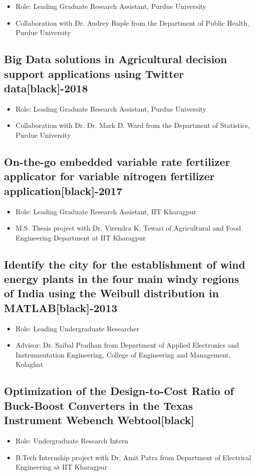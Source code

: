 \documentclass[10pt]{article}
\newcommand{\subsectiondate}[2]{%
  \subsection*{%
    #1\enspace\xdotfill[.5ex]{1pt}[black]\enspace #2%
  }%
}
\begin{document}
\begin{itemize}[label=-, labelindent=1.5em, leftmargin=2.5em, labelsep=0.6 em, itemsep =0pt, topsep=0pt]
    \item[-] Role: Leading Graduate Research Assistant, Purdue University
    \item[-] Collaboration with Dr. Audrey Ruple from the Department of Public Health, Purdue University
    
\end{itemize}
\subsectiondate{Big Data solutions in Agricultural decision support applications using Twitter data}{2017-2018}
\begin{itemize}[label=-, labelindent=1.5em, leftmargin=2.5em, labelsep=0.6 em, itemsep =0pt, topsep=0pt]
    \item[-] Role: Leading Graduate Research Assistant, Purdue University
    \item[-] Collaboration with Dr. Dr. Mark D. Ward from the Department of Statistics, Purdue University
    
\end{itemize}
\subsectiondate{On-the-go embedded variable rate fertilizer applicator for variable nitrogen fertilizer application}{2014-2017}
\begin{itemize}[label=-, labelindent=1.5em, leftmargin=2.5em, labelsep=0.6 em, itemsep =0pt, topsep=0pt]
    \item[-] Role: Leading Graduate Research Assistant, IIT Kharagpur
    \item[-] M.S. Thesis project with Dr. Virendra K. Tewari of Agricultural and Food Engineering Department at IIT Kharagpur
    
\end{itemize}
\subsectiondate{Identify the city for the establishment of wind energy plants in the four main windy regions of India using the Weibull distribution in MATLAB}{2012-2013}
\begin{itemize}[label=-, labelindent=1.5em, leftmargin=2.5em, labelsep=0.6 em, itemsep =0pt, topsep=0pt]
    \item[-] Role: Leading Undergraduate Researcher
    \item[-] Advisor: Dr. Saibal Pradhan from Department of Applied Electronics and Instrumentation Engineering, College of Engineering and Management, Kolaghat
\end{itemize}
\subsectiondate{Optimization of the Design-to-Cost Ratio of Buck-Boost Converters in the Texas Instrument Webench Webtool}{2012}
\begin{itemize}[label=-, labelindent=1.5em, leftmargin=2.5em, labelsep=0.6 em, itemsep =0pt, topsep=0pt]
    \item[-] Role: Undergraduate Research Intern
    \item[-] B.Tech Internship project with Dr. Amit Patra from Department of Electrical Engineering at IIT Kharagpur
    
\end{itemize}
\end{document}
